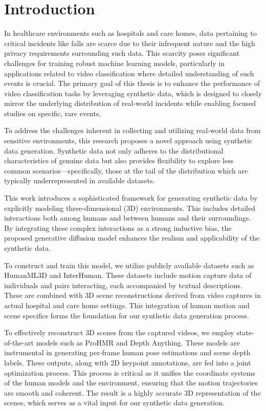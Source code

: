 \chapter{Introduction}

In healthcare environments such as hospitals and care homes, data pertaining to critical incidents like falls are scarce due to their infrequent nature and the high privacy requirements surrounding such data. This scarcity poses significant challenges for training robust machine learning models, particularly in applications related to video classification where detailed understanding of such events is crucial. The primary goal of this thesis is to enhance the performance of video classification tasks by leveraging synthetic data, which is designed to closely mirror the underlying distribution of real-world incidents while enabling focused studies on specific, rare events.

To address the challenges inherent in collecting and utilizing real-world data from sensitive environments, this research proposes a novel approach using synthetic data generation. Synthetic data not only adheres to the distributional characteristics of genuine data but also provides flexibility to explore less common scenarios—specifically, those at the tail of the distribution which are typically underrepresented in available datasets.

This work introduces a sophisticated framework for generating synthetic data by explicitly modeling three-dimensional (3D) environments. This includes detailed interactions both among humans and between humans and their surroundings. By integrating these complex interactions as a strong inductive bias, the proposed generative diffusion model enhances the realism and applicability of the synthetic data.

To construct and train this model, we utilize publicly available datasets such as HumanML3D and InterHuman. These datasets include motion capture data of individuals and pairs interacting, each accompanied by textual descriptions. These are combined with 3D scene reconstructions derived from video captures in actual hospital and care home settings. This integration of human motion and scene specifics forms the foundation for our synthetic data generation process.

To effectively reconstruct 3D scenes from the captured videos, we employ state-of-the-art models such as ProHMR and Depth Anything. These models are instrumental in generating per-frame human pose estimations and scene depth labels. These outputs, along with 2D keypoint annotations, are fed into a joint optimization process. This process is critical as it unifies the coordinate systems of the human models and the environment, ensuring that the motion trajectories are smooth and coherent. The result is a highly accurate 3D representation of the scenes, which serves as a vital input for our synthetic data generation.


